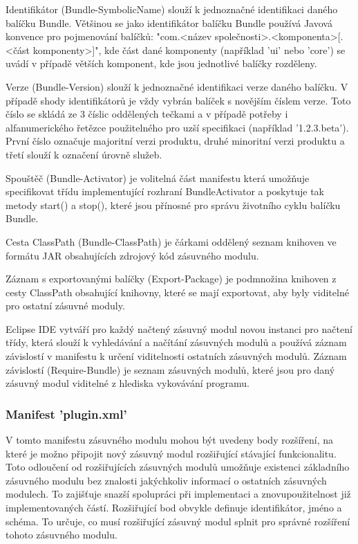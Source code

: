       Identifikátor (Bundle-SymbolicName) slouží k jednoznačné identifikaci daného balíčku Bundle. Většinou se jako identifikátor balíčku Bundle používá Javová konvence pro pojmenování balíčků: "com.<název společnosti>.<komponenta>[.<část komponenty>]", kde část dané komponenty (například 'ui' nebo 'core') se uvádí v případě větších komponent, kde jsou jednotlivé balíčky rozděleny.
      
      Verze (Bundle-Version) slouží k jednoznačné identifikaci verze daného balíčku. V případě shody identifikátorů je vždy vybrán balíček s novějším číslem verze. Toto číslo se skládá ze 3 číslic oddělených tečkami a v případě potřeby i alfanumerického řetězce použitelného pro uzší specifikaci (například '1.2.3.beta'). První číslo označuje majoritní verzi produktu, druhé minoritní verzi produktu a třetí slouží k označení úrovně služeb.

      Spouštěč (Bundle-Activator) je volitelná část manifestu která umožňuje specifikovat třídu implementující rozhraní BundleActivator a poskytuje tak metody start() a stop(), které jsou přínosné pro správu životního cyklu balíčku Bundle.
      
      Cesta ClassPath (Bundle-ClassPath) je čárkami oddělený seznam knihoven ve formátu JAR obsahujících zdrojový kód zásuvného modulu.
      
      Záznam s exportovanými balíčky (Export-Package) je podmnožina knihoven z cesty ClassPath obsahující knihovny, které se mají exportovat, aby byly viditelné pro ostatní zásuvné moduly.
      
      Eclipse IDE vytváří pro každý načtený zásuvný modul novou instanci pro načtení třídy, která slouží k vyhledávání a načítání zásuvných modulů a používá záznam závislostí v manifestu k určení viditelnosti ostatních zásuvných modulů. Záznam závislostí (Require-Bundle) je seznam zásuvných modulů, které jsou pro daný zásuvný modul viditelné z hlediska vykovávání programu. 
      
      \subsubsection{Manifest 'plugin.xml'}
      V tomto manifestu zásuvného modulu mohou být uvedeny body rozšíření, na které je možno připojit nový zásuvný modul rozšiřující stávající funkcionalitu. Toto odloučení od rozšiřujících zásuvných modulů umožňuje existenci základního zásuvného modulu bez znalosti jakýchkoliv informací o ostatních zásuvných modulech. To zajišťuje snazší spolupráci při implementaci a znovupoužitelnost již implementovaných částí. Rozšiřující bod obvykle definuje identifikátor, jméno a schéma. To určuje, co musí rozšiřující zásuvný modul splnit pro správné rozšíření tohoto zásuvného modulu.
      

